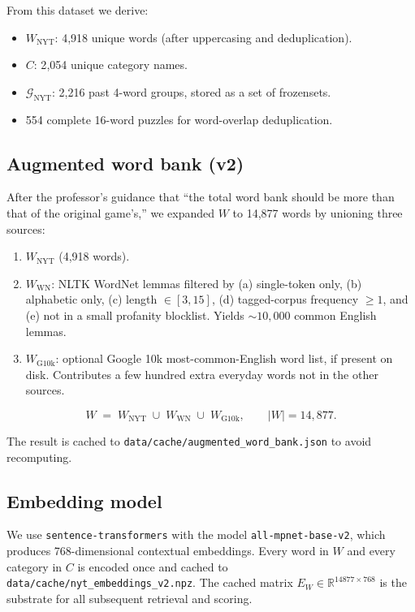 \documentclass[11pt, letterpaper]{article}
\begin{document}
From this dataset we derive:
\begin{itemize}[leftmargin=*, itemsep=0.1em]
\item $W_\text{NYT}$: 4{,}918 unique words (after uppercasing and deduplication).
\item $C$: 2{,}054 unique category names.
\item $\mathcal{G}_\text{NYT}$: 2{,}216 past 4-word groups, stored as a set of frozensets.
\item 554 complete 16-word puzzles for word-overlap deduplication.
\end{itemize}

\subsection{Augmented word bank (v2)}
\label{sec:wordbank}

After the professor's guidance that ``the total word bank should be more than that
of the original game's,'' we expanded $W$ to 14{,}877 words by unioning three
sources:
\begin{enumerate}[leftmargin=*, itemsep=0.1em]
\item $W_\text{NYT}$ (4{,}918 words).
\item $W_\text{WN}$: NLTK WordNet lemmas filtered by (a) single-token only,
(b) alphabetic only, (c) length $\in [3, 15]$, (d) tagged-corpus frequency $\geq 1$,
and (e) not in a small profanity blocklist. Yields $\sim 10{,}000$ common English
lemmas.
\item $W_\text{G10k}$: optional Google 10k most-common-English word list, if
present on disk. Contributes a few hundred extra everyday words not in the
other sources.
\end{enumerate}

\begin{equation}
W \;=\; W_\text{NYT} \;\cup\; W_\text{WN} \;\cup\; W_\text{G10k}, \qquad |W| = 14{,}877.
\end{equation}

The result is cached to \texttt{data/cache/augmented\_word\_bank.json} to avoid
recomputing.

\subsection{Embedding model}
We use \texttt{sentence-transformers} with the model \texttt{all-mpnet-base-v2},
which produces 768-dimensional contextual embeddings. Every word in $W$ and every
category in $C$ is encoded once and cached to
\texttt{data/cache/nyt\_embeddings\_v2.npz}. The cached matrix $E_W \in
\mathbb{R}^{14877 \times 768}$ is the substrate for all subsequent retrieval and
scoring.
\end{document}
